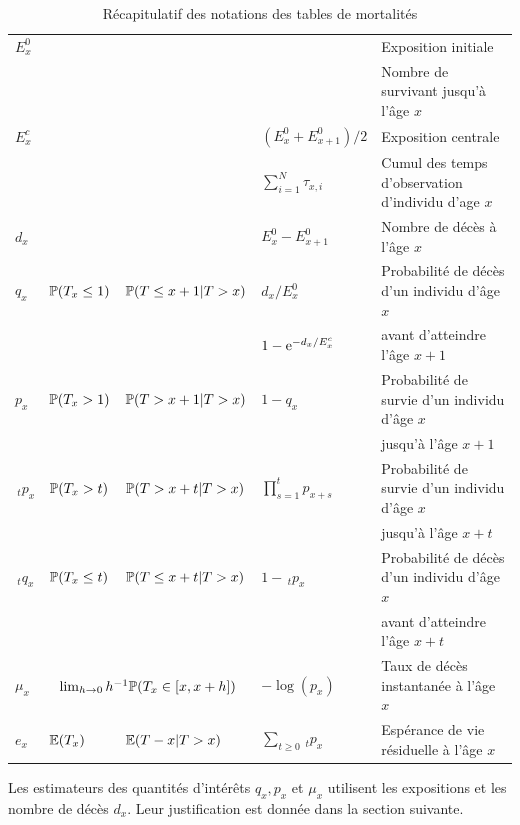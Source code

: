 \begin{table}[ht!]\centering
\begin{tabular}{@{}lllll@{}}
\toprule
$E_x^0$&&&&Exposition initiale\\
&&&&Nombre de survivant jusqu'à l'âge $x$\\
\midrule
$E_x^c$&&&$(E_x^0 + E_{x+1}^0)/2 $&Exposition centrale\\

&&&$\sum_{i=1}^N\tau_{x,i}$&Cumul des temps d'observation d'individu d'age $x$\\
\midrule

$d_x$&&&$E^0_{x} - E^0_{x+1}$&Nombre de décès à l'âge $x$\\
\midrule
$q_x$&$\mathbb{P}(T_x \leq 1)$&$\mathbb{P}(T \leq x+1|T> x)$&$d_x/E^0_x$& Probabilité de décès d'un individu d'âge $x$ \\
&&&$1-\mathrm{e}^{-d_x/E_x^c}$&avant d'atteindre l'âge $x+1$\\
\midrule
$p_x$&$\mathbb{P}(T_x > 1)$&$\mathbb{P}(T > x+1|T> x)$&$1-q_x$ &Probabilité de survie d'un individu d'âge $x$ \\
&&&&jusqu'à l'âge $x+1$\\
\midrule
$\,_tp_x$&$\mathbb{P}(T_x > t)$&$\mathbb{P}(T > x+t|T> x)$&$\prod_{s=1}^tp_{x+s}$& Probabilité de survie d'un individu d'âge $x$ \\
&&&&jusqu'à l'âge $x+t$\\
\midrule
$\,_tq_x$&$\mathbb{P}(T_x \leq t)$&$\mathbb{P}(T \leq x+t|T> x)$&$1 - \,_tp_x$& Probabilité de décès d'un individu d'âge $x$ \\
&&&&avant d'atteindre l'âge $x+t$\\
\midrule

$\mu_x$&\multicolumn{2}{c}{$\lim_{h\rightarrow 0}h^{-1}\mathbb{P}(T_x\in[x,x+h])$}&$-\log(p_x)$ &Taux de décès instantanée à l'âge $x$\\
\midrule
$e_x$&$\mathbb{E}(T_x)$&$\mathbb{E}(T-x|T>x)$&$\sum_{t\geq 0} \,_tp_x$ &Espérance de vie résiduelle à l'âge $x$\\
\bottomrule
\end{tabular}
\caption{Récapitulatif des notations des tables de mortalités}
\label{tab:notation_mortality_table}
\end{table}
Les estimateurs des quantités d'intérêts $q_x, p_x$ et $\mu_x$ utilisent les expositions et les nombre de décès $d_x$. Leur justification est donnée dans la section suivante.
